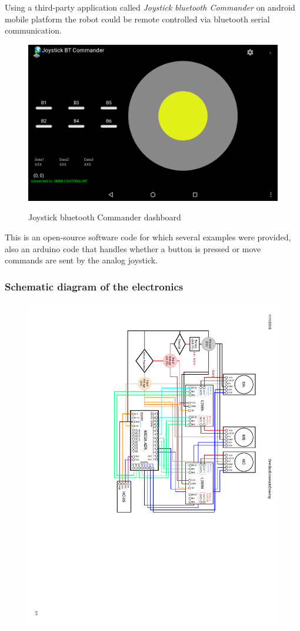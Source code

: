 \documentclass[12pt,english,twoside]{article}
\begin{document}
Using a third-party application called \textit{Joystick bluetooth Commander} on android mobile platform the robot could be remote controlled via bluetooth serial communication.
\begin{figure}[htb!]
	\centering
	\includegraphics[width=\textwidth]{figures/jybt.png}
	\label{electronics}
	\caption{Joystick bluetooth Commander dashboard}
\end{figure}
This is an open-source software code for which several examples were provided, also an arduino code that handles whether a button is pressed or move commands are sent by the analog joystick.
\newpage
\subsubsection{Schematic diagram of the electronics}
\begin{figure}[htb!]
	\centering
	\includegraphics[width=\textwidth]{figures/Rotated}
	\label{schematic_drawing}
\end{figure}
\newpage
\end{document}
